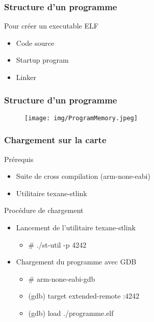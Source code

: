\documentclass{beamer}
\begin{document}
			\begin{frame}
				\frametitle{Structure d'un programme}
				Pour créer un executable ELF
				\begin{itemize}
					\item Code source
					\item Startup program
					\item Linker
				\end{itemize}
			\end{frame}
			
			\begin{frame}
				\frametitle{Structure d'un programme}
				\begin{figure}
					\texttt{[image: img/ProgramMemory.jpeg]}
				\end{figure}
			\end{frame}
			
			\begin{frame}
				\frametitle{Chargement sur la carte}
				\begin{alertblock}{ Prérequis }
					\begin{itemize}
						\item Suite de cross compilation (arm-none-eabi)
						\item Utilitaire texane-stlink
					\end{itemize}
				\end{alertblock}
				
				\begin{block}{ Procédure de chargement }
					\begin{itemize}
						\item Lancement de l'utilitaire texane-stlink
							\begin{itemize}
								\item \# ./st-util -p 4242
							\end{itemize}
						\item Chargement du programme avec GDB
							\begin{itemize}
								\item \# arm-none-eabi-gdb
								\item (gdb) target extended-remote :4242
								\item (gdb) load ./programme.elf
							\end{itemize}
					\end{itemize}
				\end{block}
			\end{frame}
	
	
	
\end{document}
